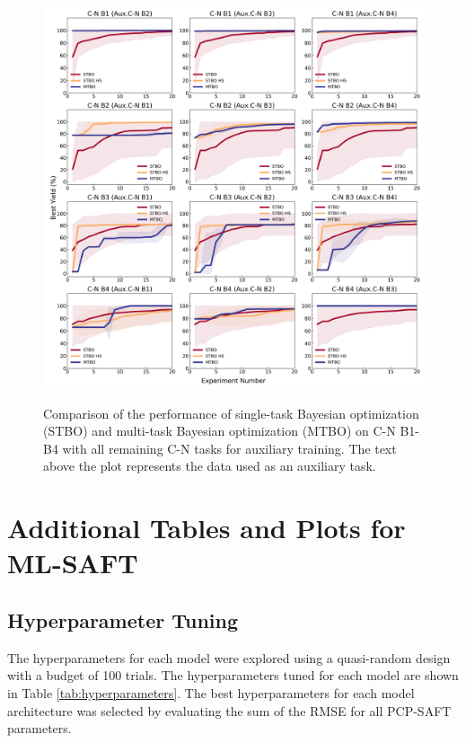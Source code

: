 \begin{figure}
\caption{Comparison of the performance of single-task Bayesian optimization (STBO) and multi-task Bayesian optimization (MTBO) on C-N B1-B4 with all remaining C-N tasks for auxiliary training. The text above the plot represents the data used as an auxiliary task.}\includegraphics[width=1\textwidth]{gfx/Appendix/baumgartner_cn_baumgartner_cn_one_cotraining_optimization.png}
\label{fig:14}
\end{figure}



\chapter{Additional Tables and Plots for ML-SAFT}

\section{Hyperparameter Tuning}

The hyperparameters for each model were explored using a quasi-random design \cite{Bosquet2017} with a budget of 100 trials. The hyperparameters tuned for each model are shown in Table \ref{tab:hyperparameters}. The best hyperparameters for each model architecture was selected by evaluating the sum of the RMSE for all PCP-SAFT parameters.

